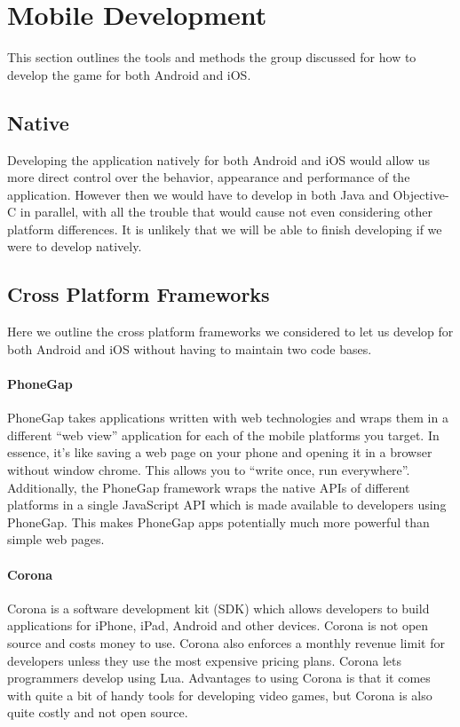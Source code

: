 \section{Mobile Development}

This section outlines the tools and methods the group discussed for how to
develop the game for both Android and iOS.

\subsection{Native}

Developing the application natively for both Android and iOS would allow us more
direct control over the behavior, appearance and performance of the application.
However then we would have to develop in both Java and Objective-C in parallel,
with all the trouble that would cause not even considering other platform
differences. It is unlikely that we will be able to finish developing if we were
to develop natively.

\subsection{Cross Platform Frameworks}

Here we outline the cross platform frameworks we considered to let us develop for
both Android and iOS without having to maintain two code bases.

\paragraph{PhoneGap}
PhoneGap takes applications written with web technologies and wraps them in
a different ``web view'' application for each of the mobile platforms you
target. In essence, it's like saving a web page on your phone and opening
it in a browser without window chrome. This allows you to ``write once, run
everywhere''. Additionally, the PhoneGap framework wraps the native APIs of
different platforms in a single JavaScript API which is made available to
developers using PhoneGap. This makes PhoneGap apps potentially much more
powerful than simple web pages. \cite{phonegapAbout}

\paragraph{Corona}

Corona is a software development kit (SDK) which allows developers to build
applications for iPhone, iPad, Android and other devices. Corona is not open
source and costs money to use. Corona also enforces a monthly revenue limit for
developers unless they use the most expensive pricing plans\cite{coronaPrice}.
Corona lets programmers develop using Lua.\cite{coronaSDK} Advantages to using
Corona is that it comes with quite a bit of handy tools for developing video
games, but Corona is also quite costly and not open source.

